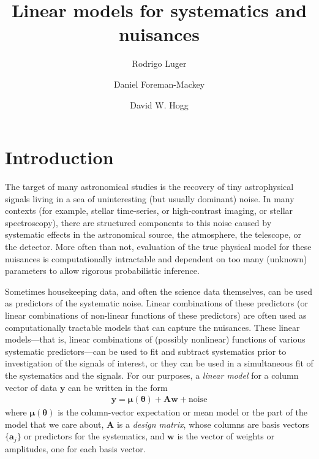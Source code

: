 \documentclass[modern]{rnaastex}
\newcommand{\eqlabel}[1]{\label{eq:#1}}
\newcommand{\bvec}[1]{{\ensuremath{\boldsymbol{#1}}}}
\newcommand{\mA}{\ensuremath{\bvec{A}}}
\newcommand{\vw}{\ensuremath{\bvec{w}}}
\newcommand{\vy}{\ensuremath{\bvec{y}}}
\newcommand{\vm}{\ensuremath{\bvec{\mu}(\bvec{\theta})}}
\begin{document}
\raggedbottom\sloppy\sloppypar\frenchspacing

\title{%
    Linear models for systematics and nuisances
}

\author[0000-0002-0296-3826]{Rodrigo Luger}

\author[0000-0002-9328-5652]{Daniel Foreman-Mackey}

\author[0000-0003-2866-9403]{David W. Hogg}

\section{Introduction}

The target of many astronomical studies is the recovery of tiny astrophysical
signals living in a sea of uninteresting (but usually dominant) noise.
In many contexts (for example, stellar time-series, or
high-contrast imaging, or stellar spectroscopy), there are structured
components to this noise caused by systematic
effects in the astronomical source, the atmosphere, the telescope, or
the detector.
More often than not, evaluation of the true physical model for these nuisances
is computationally intractable and dependent on too many (unknown) parameters
to allow rigorous probabilistic inference.

Sometimes housekeeping data, and often the science data themselves,
can be used as predictors of the systematic noise.
Linear combinations of these predictors (or linear combinations of non-linear functions
of these predictors) are often used as
computationally tractable models that can capture the nuisances.
These linear models---that is, linear combinations of (possibly nonlinear) functions
of various systematic predictors---can be used to fit and subtract systematics prior to
investigation of the signals of interest, or they can be used in a
simultaneous fit of the systematics and the signals.
For our purposes, a \emph{linear model} for a column vector of data $\vy$
can be written in the form
\begin{align}
\eqlabel{linearmodel}
\bvec{y} = \vm + \mA \vw + \mathrm{noise}
\end{align}
where $\vm$ is the column-vector expectation or mean model or the part of the model
that we care about, $\mA$ is a \emph{design matrix}, whose columns are basis
vectors $\{\bvec{a}_j\}$ or predictors for the systematics,
and $\vw$ is the vector of weights or amplitudes, one
for each basis vector.
\end{document}
